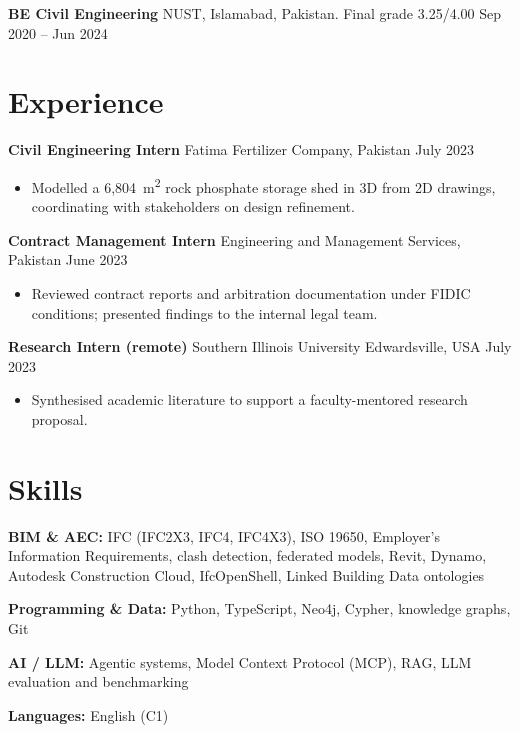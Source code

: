 \documentclass[a4paper,10.5pt]{article}
\newcommand{\datefill}{\dotfill}
\newcommand{\entry}[3]{\vspace{2.5pt}\noindent\textbf{#1} \textbar{} #2 \datefill{} #3\par\vspace{0.5pt}}
\newcommand{\skillrow}[2]{\noindent\textbf{#1:} #2\par\vspace{1pt}}
\begin{document}
\entry{BE Civil Engineering}{NUST, Islamabad, Pakistan. Final grade 3.25/4.00}{Sep 2020 -- Jun 2024}

\section{Experience}
\entry{Civil Engineering Intern}{Fatima Fertilizer Company, Pakistan}{July 2023}
\begin{itemize}
  \item Modelled a 6,804~m\textsuperscript{2} rock phosphate storage shed in 3D from
        2D drawings, coordinating with stakeholders on design refinement.
\end{itemize}

\entry{Contract Management Intern}{Engineering and Management Services, Pakistan}{June 2023}
\begin{itemize}
  \item Reviewed contract reports and arbitration documentation under FIDIC
        conditions; presented findings to the internal legal team.
\end{itemize}

\entry{Research Intern (remote)}{Southern Illinois University Edwardsville, USA}{July 2023}
\begin{itemize}
  \item Synthesised academic literature to support a faculty-mentored research proposal.
\end{itemize}

\section{Skills}

\skillrow{BIM \& AEC}{IFC (IFC2X3, IFC4, IFC4X3), ISO 19650, Employer's Information Requirements, clash detection, federated models, Revit, Dynamo, Autodesk Construction Cloud, IfcOpenShell, Linked Building Data ontologies}
\skillrow{Programming \& Data}{Python, TypeScript, Neo4j, Cypher, knowledge graphs, Git}
\skillrow{AI / LLM}{Agentic systems, Model Context Protocol (MCP), RAG, LLM evaluation and benchmarking}

\skillrow{Languages}{English (C1)}
\end{document}
